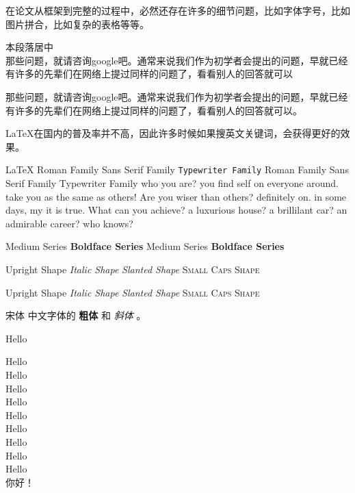 \documentclass[12pt]{ctexart} %
\begin{document}
	\fangsong 在论文从框架到完整的过程中，必然还存在许多的细节问题，比如字体字号，比如图片拼合，比如复杂的表格等等。 

	\begin{center}
	\vspace{-0.8em}%
    本\hspace{1em}段\hspace{1em}落\hspace{1em}居\hspace{1em}中\\%
	那些问题，就请咨询google吧。通常来说我们作为初学者会提出的问题，早就已经有许多的先辈们在网络上提过同样的问题了，看看别人的回答就可以
	\vspace{-0.8em}%
    \end{center}
	那些问题，就请咨询google吧。通常来说我们作为初学者会提出的问题，早就已经有许多的先辈们在网络上提过同样的问题了，看看别人的回答就可以。
	 
	LaTeX在国内的普及率并不高，因此许多时候如果搜英文关键词，会获得更好的效果。

	\LaTeX
	\newpage
     \textrm{Roman Family} \textsf{Sans Serif Family} \texttt{Typewriter Family}    
     {\rmfamily Roman Family} {\sffamily Sans Serif Family} {\ttfamily Typewriter Family}
     {\sffamily who you are? you find self on everyone around. take you as the same as others!}
     {\ttfamily Are you wiser than others? definitely on. in some days, my it is true. What can you achieve? a luxurious house? a brillilant car? an admirable career? who knows?}
     
     \textmd{Medium Series} \textbf{Boldface Series}
     {\mdseries Medium Series} {\bfseries Boldface Series}
     
     \textup{Upright Shape} \textit{Italic Shape} \textsl{Slanted Shape} \textsc{Small Caps Shape}
     
     {\upshape Upright Shape} {\itshape Italic Shape} {\slshape Slanted Shape} {\scshape Small Caps Shape}
     
     {\songti 宋体}   
     中文字体的 \textbf{粗体} 和 \textit{斜体} 。
     
     {\tiny           Hello}\par
     {\scriptsize     Hello}\\
     {\footnotesize   Hello}\\
     {\small          Hello}\\
     {\normalsize      Hello}\\
     {\large          Hello}\\
     {\Large          Hello}\\
     {\LARGE          Hello}\\
     {\huge           Hello}\\     
     {\Huge           Hello}\\     
      你好！%
     
\end{document}
